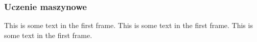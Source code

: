 \begin{frame}
    \frametitle{Uczenie maszynowe}
    This is some text in the first frame. This is some text in the first frame. This is some text in the first frame.
\end{frame}